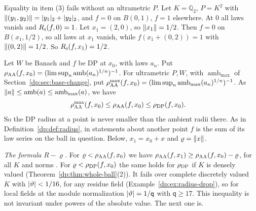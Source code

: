 Equality in item (3) fails without an ultrametric $P$. Let $K=\mathbb Q_2$, $P=K^2$ with $\lVert (y_1,y_2)\rVert=\lvert y_1\rvert_2+\lvert y_2\rvert_2$, and $f=0$ on $B(0,1)$, $f=1$ elsewhere. At $0$ all laws vanish and $R_{\rm s}(f,0)=1$. Let $x_1=(2,0)$, so $\lVert x_1\rVert=1/2$. Then $f=0$ on $B(x_1,1/2)$, so all laws at $x_1$ vanish, while $f(x_1+(0,2))=1$ with $\lVert (0,2)\rVert=1/2$. So $R_{\rm s}(f,x_1)=1/2$.

\begin{remark}\label{dp:rem:radius-contrast}
Let $W$ be Banach and $f$ be DP at $x_0$, with laws $a_n$. Put $\rho_{\rm AA}(f,x_0)=(\limsup_n\operatorname{amb}(a_n)^{1/n})^{-1}$. For ultrametric $P,W$, with $\operatorname{amb}_{\max}$ of Section~\ref{dp:sec:base-change}, put $\rho^{\max}_{\rm AA}(f,x_0)=(\limsup_n\operatorname{amb}_{\max}(a_n)^{1/n})^{-1}$. As $\lVert a\rVert\le\operatorname{amb}(a)\le\operatorname{amb}_{\max}(a)$, we have
\[
 \rho^{\max}_{\rm AA}(f,x_0)\le\rho_{\rm AA}(f,x_0)\le\rho_{\rm DP}(f,x_0).
\]
So the DP radius at a point is never smaller than the ambient radii there. As in Definition~\ref{dp:def:radius}, in statements about another point $f$ is the sum of its law series on the ball in question. Below, $x_1=x_0+x$ and $\varrho=\lVert x\rVert$.

\emph{The formula $R-\varrho$.} For $\varrho<\rho_{\rm AA}(f,x_0)$ we have $\rho_{\rm AA}(f,x_1)\ge\rho_{\rm AA}(f,x_0)-\varrho$, for all $K$ and norms \cite[Propositions~14.9(1), 14.12(2)]{I}. For $\varrho<\rho_{\rm DP}(f,x_0)$ the same holds for $\rho_{\rm DP}$ if $K$ is densely valued (Theorem~\ref{dp:thm:whole-ball}(2)). It fails over complete discretely valued $K$ with $\lvert \vartheta\rvert<1/16$, for any residue field (Example~\ref{dp:ex:radius-drop}), so for local fields at the module normalization $\lvert \vartheta\rvert=1/\mathsf q$ with $\mathsf q\ge17$. This inequality is not invariant under powers of the absolute value. The next one is.


\end{remark}
